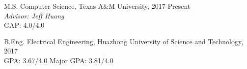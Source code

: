 \documentclass[12pt,letterpaper]{report}
\begin{document}
	\begin{tablist}
		
		
		\item[M.S.]  \tab Computer Science, Texas A\&M University, 2017-Present \\
		\textit{Advisor: Jeff Huang}\\
		GAP: 4.0/4.0
		
		\item[B.Eng.]  \tab Electrical Engineering, Huazhong University of Science and Technology, 2017 \\
		GPA: 3.67/4.0 \hspace{0.5cm} Major GPA: 3.81/4.0
				
	\end{tablist}
	
	
	
%	
%		
%		
%		
%		
%		


	
\end{document}
